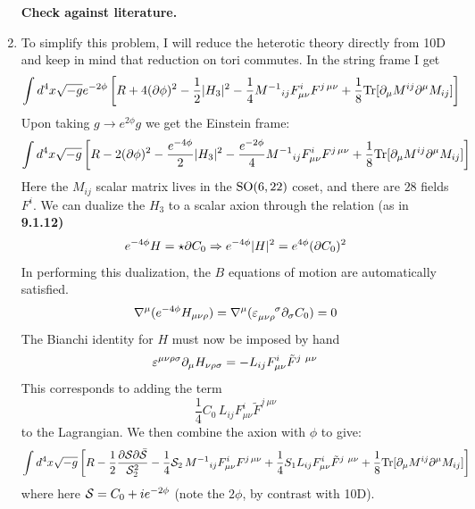 \documentclass[11pt, class=article, crop=false]{standalone}
\begin{document}
\begin{enumerate}
	\textbf{Check against literature.}
	
	\item 
	To simplify this problem, I will reduce the heterotic theory directly from 10D and keep in mind that reduction on tori commutes. In the string frame I get
	\[
		\int d^4 x \sqrt{-g} e^{-2\phi} \left[R + 4 (\d \phi)^2 - \frac12 |H_3|^2 - \frac14 {M^{-1}}_{ij} F_{\mu \nu}^i F^{j\, \mu \nu} + \frac18 \Tr[\d_\mu M^{ij} \d^\mu M_{ij}] \right]
	\]
	Upon taking $g \to e^{2\phi} g$ we get the Einstein frame:
	\[
		\int d^4 x \sqrt{-g} \left[R - 2 (\d \phi)^2 - \frac{e^{-4 \phi}}{2} |H_3|^2 - \frac{e^{-2 \phi}}{4} {M^{-1}}_{ij} F_{\mu \nu}^i F^{j\, \mu \nu} + \frac18 \Tr[\d_\mu M^{ij} \d^\mu M_{ij}] \right]
	\]
	Here the $M_{ij}$ scalar matrix lives in the $\SO(6, 22)$ coset, and there are $28$ fields $F^i$. We can dualize the $H_3$ to a scalar axion through the relation (as in \textbf{9.1.12)}
	\[
		e^{-4\phi} H = \star \d C_0 \Rightarrow e^{-4 \phi} |H|^2 = e^{4 \phi} (\d C_0)^2
	\]
	In performing this dualization, the $B$ equations of motion are automatically satisfied.
	\[
		\nabla^\mu (e^{-4 \phi} H_{\mu \nu \rho}) = \nabla^\mu(\varepsilon_{\mu \nu \rho}^{\ \ \ \ \sigma} \d_\sigma C_0) = 0
	\]
	The Bianchi identity for $H$ must now be imposed by hand 
	\[
		\varepsilon^{\mu \nu \rho \sigma} \d_\mu H_{\nu \rho \sigma} = - L_{ij} F^i_{\mu \nu} \tilde F^{j\ \mu \nu} 
	\]
	This corresponds to adding the term 
	\[
		\frac14 C_0\, L_{ij} F^i_{\mu \nu} \tilde F^{j\ \mu \nu}
	\]
	to the Lagrangian. 
	We then combine the axion with $\phi$ to give:
	\[
		\int d^4 x \sqrt{-g} \left[R - \frac12 \frac{\d \S \d \bar \S}{\S_2^2}  - \frac{1}{4} \S_2\, {M^{-1}}_{ij} F_{\mu \nu}^i F^{j\, \mu \nu} + \frac14 S_1 L_{ij} F_{\mu \nu}^i \tilde F^{j\ \mu \nu} + \frac18 \Tr[\d_\mu M^{ij} \d^\mu M_{ij}] \right]
	\]
	where here $\S = C_0 + i e^{-2\phi}$ (note the $2 \phi$, by contrast with 10D).
	
	

\end{enumerate}
\end{document}
